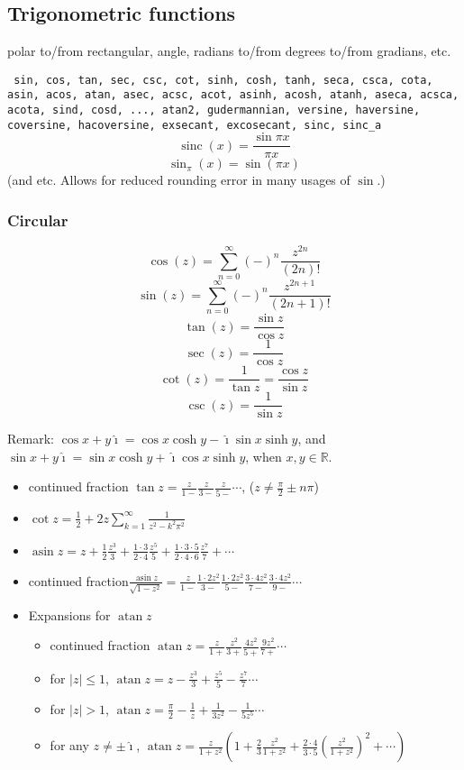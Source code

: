 \documentclass[10pt,dvipdfmx,letterpaper,twoside]{article}
\DeclareMathOperator{\asin}{asin}
\DeclareMathOperator{\atan}{atan}
\let\O=\operatorname
\newcommand{\RR}{{\mathbb{R}}}
\newcommand{\ii}{{\hat{\imath}}}
\newenvironment{implementation}{\noindent\begin{framed}}{\end{framed}}
\begin{document}
\subsection{Trigonometric functions}

polar to/from rectangular, angle, radians to/from degrees to/from gradians, etc.

{\tt
sin, cos, tan, sec, csc, cot,
sinh, cosh, tanh, seca, csca, cota,
asin, acos, atan, asec, acsc, acot,
asinh, acosh, atanh, aseca, acsca, acota,
sind, cosd, ..., atan2, gudermannian,
versine, haversine, coversine, hacoversine, exsecant, excosecant,
sinc, sinc\_a}
\[ \O{sinc}(x) = \frac{\sin \pi x}{\pi x} \]
\[ \O{sin}_\pi(x) = \sin(\pi x) \]
(and etc.  Allows for reduced rounding error in many usages of $\sin$.)

\subsubsection{Circular}
\[ \cos(z) = \sum_{n=0}^\infty (-)^n\frac{z^{2n}}{(2n)!} \]
\[ \sin(z) = \sum_{n=0}^\infty (-)^n\frac{z^{2n+1}}{(2n+1)!} \]
\[ \tan(z) = \frac{\sin z}{\cos z} \]
\[ \sec(z) = \frac{1}{\cos z} \]
\[ \cot(z) = \frac{1}{\tan z} = \frac{\cos z}{\sin z} \]
\[ \csc(z) = \frac{1}{\sin z} \]

Remark: $\cos x+y\ii = \cos x \cosh y - \ii \sin x \sinh y$, and 
$\sin x+y\ii = \sin x \cosh y + \ii \cos x \sinh y$, when $x,y\in\RR$.

\begin{implementation}
\begin{itemize}
\item continued fraction $\tan z = \frac{z}{1-} \frac{z}{3-} \frac{z}{5-} \cdots$, ($z\neq\frac\pi2\pm n\pi$)
\item $\cot z = \frac12 + 2z\sum_{k=1}^\infty\frac{1}{z^2 - k^2\pi^2}$
\item $\asin z = z + \frac{1}{2}\frac{z^3}{3} + \frac{1\cdot3}{2\cdot4}\frac{z^5}{5} + \frac{1\cdot3\cdot5}{2\cdot4\cdot6}\frac{z^7}{7} + \cdots$
\item continued fraction$\frac{\asin z}{\sqrt{1 - z^2}} = \frac{z}{1 - } \frac{1\cdot2 z^2}{3-} \frac{1\cdot2 z^2}{5-} \frac{3\cdot4 z^2}{7-} \frac{3\cdot4 z^2}{9-} \cdots$
\item Expansions for $\atan z$
  \begin{itemize}
  \item continued fraction $\atan z = \frac{z}{1+} \frac{z^2}{3+} \frac{4z^2}{5+} \frac{9z^2}{7+} \cdots$
  \item for $|z|\leq 1$, $\atan z = z - \frac{z^3}{3} + \frac{z^5}{5} - \frac{z^7}{7} \cdots$
  \item for $|z|> 1$, $\atan z = \frac{\pi}{2} - \frac{1}{z} + \frac{1}{3z^2} - \frac{1}{5z^5} \cdots$
  \item for any $z\neq\pm\ii$, $\atan z = \frac{z}{1+z^2}\left(1 + \frac{2}{3}\frac{z^2}{1+z^2} + \frac{2\cdot4}{3\cdot5}(\frac{z^2}{1+z^2})^2+\cdots\right)$
  \end{itemize}
\end{itemize}
\end{implementation}
\end{document}
